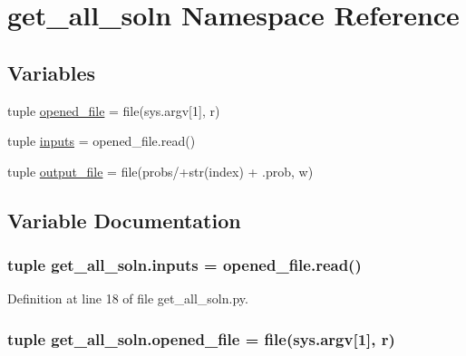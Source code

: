 \hypertarget{namespaceget__all__soln}{}\section{get\+\_\+all\+\_\+soln Namespace Reference}
\label{namespaceget__all__soln}
\subsection*{Variables}
\begin{DoxyCompactItemize}
\item 
tuple \hyperlink{namespaceget__all__soln_a8a2e063607a9c61cff17994a35c63763}{opened\+\_\+file} = file(sys.\+argv\mbox{[}1\mbox{]}, \textquotesingle{}r\textquotesingle{})
\item 
tuple \hyperlink{namespaceget__all__soln_a8ec0c92a3d60c2d55db17bff79a7d724}{inputs} = opened\+\_\+file.\+read()
\item 
tuple \hyperlink{namespaceget__all__soln_a7fa2bae5f6d50024567ab2b36196692b}{output\+\_\+file} = file(\textquotesingle{}probs/\textquotesingle{}+str(index) + \textquotesingle{}.prob\textquotesingle{}, \textquotesingle{}w\textquotesingle{})
\end{DoxyCompactItemize}


\subsection{Variable Documentation}
\hypertarget{namespaceget__all__soln_a8ec0c92a3d60c2d55db17bff79a7d724}{}
\subsubsection[{inputs}]{\setlength{\rightskip}{0pt plus 5cm}tuple get\+\_\+all\+\_\+soln.\+inputs = opened\+\_\+file.\+read()}\label{namespaceget__all__soln_a8ec0c92a3d60c2d55db17bff79a7d724}


Definition at line 18 of file get\+\_\+all\+\_\+soln.\+py.

\hypertarget{namespaceget__all__soln_a8a2e063607a9c61cff17994a35c63763}{}
\subsubsection[{opened\+\_\+file}]{\setlength{\rightskip}{0pt plus 5cm}tuple get\+\_\+all\+\_\+soln.\+opened\+\_\+file = file(sys.\+argv\mbox{[}1\mbox{]}, \textquotesingle{}r\textquotesingle{})}\label{namespaceget__all__soln_a8a2e063607a9c61cff17994a35c63763}


